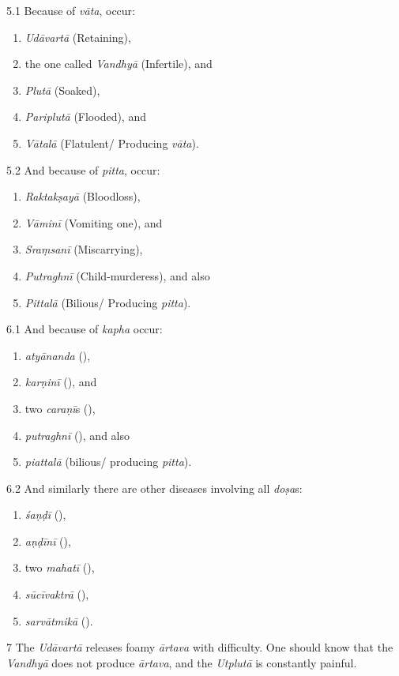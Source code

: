 \begin{translation}
\item [5.1] Because of \emph{vāta}, occur:
	\begin{enumerate}
		\item \emph{Udāvartā} (Retaining),
		\item the one called \emph{Vandhyā} (Infertile), and
		\item \emph{Plutā} (Soaked),
		\item \emph{Pariplutā} (Flooded), and
		\item \emph{Vātalā} (Flatulent/ Producing \emph{vāta}).
	\end{enumerate}
\item [5.2] And because of \emph{pitta}, occur:
	\begin{enumerate}
		\item \emph{Raktakṣayā} (Bloodloss),
		\item \emph{Vāminī} (Vomiting one), and
		\item \emph{Sraṃsanī} (Miscarrying),
		\item \emph{Putraghnī} (Child-murderess), and also
		\item \emph{Pittalā} (Bilious/ Producing \emph{pitta}).
	\end{enumerate}


\item [6.1] And because of \emph{kapha} occur:
	\begin{enumerate}
		\item \emph{atyānanda} (),
		\item \emph{karṇinī} (), and
		\item two \emph{caraṇī}s (),
		\item \emph{putraghnī} (), and also
		\item \emph{piattalā} (bilious/ producing \emph{pitta}).
	\end{enumerate}

\item [6.2] And similarly there are other diseases involving all \emph{doṣa}s:
	\begin{enumerate}
		\item \emph{śaṇḍī} (),
		\item \emph{aṇḍīnī} (),
		\item two \emph{mahatī} (),
		\item \emph{sūcīvaktrā} (),
		\item \emph{sarvātmikā} ().
	\end{enumerate}

\item [7] The \emph{Udāvartā} releases foamy \emph{ārtava} with difficulty. 
One should know that the \emph{Vandhyā} does not produce \emph{ārtava}, and the \emph{Utplutā} is constantly painful. 


\end{translation}

